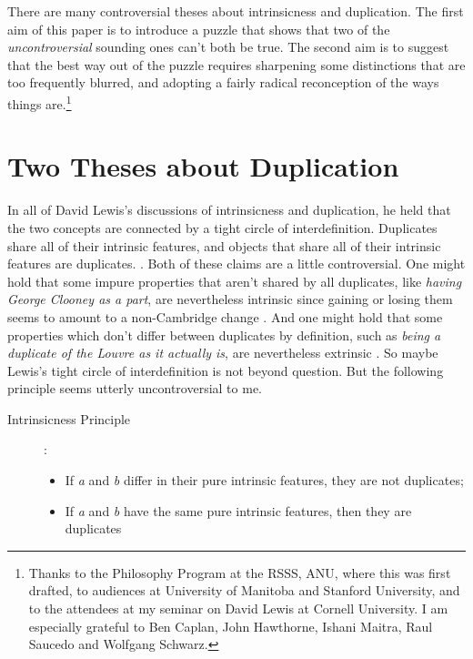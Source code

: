 There are many controversial theses about intrinsicness and duplication. The first aim of this paper is to introduce a puzzle that shows that two of the \textit{uncontroversial} sounding ones can't both be true. The second aim is to suggest that the best way out of the puzzle requires sharpening some distinctions that are too frequently blurred, and adopting a fairly radical reconception of the ways things are.\footnote{Thanks to the Philosophy Program at the RSSS, ANU, where this was first drafted, to audiences at University of Manitoba and Stanford University, and to the attendees at my seminar on David Lewis at Cornell University. I am especially grateful to Ben Caplan, John Hawthorne, Ishani Maitra, Raul Saucedo and Wolfgang Schwarz.}


\section{Two Theses about Duplication}

In all of David Lewis's discussions of intrinsicness and duplication, he held that the two concepts are connected by a tight circle of interdefinition. Duplicates share all of their intrinsic features, and objects that share all of their intrinsic features are duplicates. \citep{Lewis1983e, Lewis1983b, Lewis1998Langton}. Both of these claims are a little controversial. One might hold that some impure properties that aren't shared by all duplicates, like \textit{having George Clooney as a part}, are nevertheless intrinsic since gaining or losing them seems to amount to a non-Cambridge change \citep{Weatherson2006-WEAIVE}. And one might hold that some properties which don't differ between duplicates by definition, such as \textit{being a duplicate of the Louvre as it actually is}, are nevertheless extrinsic \citep{Dunn1990}. So maybe Lewis's tight circle of interdefinition is not beyond question. But the following principle seems utterly uncontroversial to me.

\begin{description}
\item[Intrinsicness Principle]: 
\begin{itemize}
\item If \textit{a} and \textit{b} differ in their pure intrinsic features, they are not duplicates;
\item If \textit{a} and \textit{b }have the same pure intrinsic features, then they are duplicates
\end{itemize}
\end{description}

